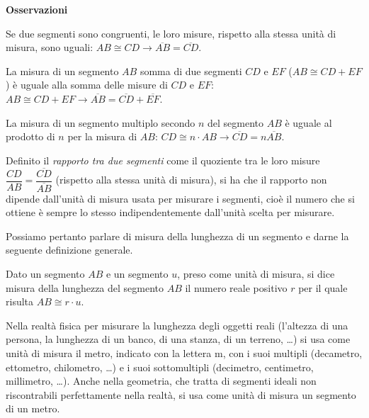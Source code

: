 \textbf{Osservazioni}
\begin{itemize*}
\item Se due segmenti sono congruenti, le loro misure, rispetto alla stessa unità di misura, sono uguali: $AB\cong CD \rightarrow \overline{AB}=\overline{CD}$.
\item La misura di un segmento $AB$ somma di due segmenti $CD$ e $EF$ ($AB\cong CD + EF$) è uguale alla somma delle misure di $CD$ e $EF$: $AB\cong CD + EF \rightarrow \overline{AB}=\overline{CD}+\overline{EF}$.
\item La misura di un segmento multiplo secondo $n$ del segmento $AB$ è uguale al prodotto di $n$ per la misura di $AB$: $CD\cong n\cdot AB \rightarrow \overline{CD}=n\overline{AB}$.
\item Definito il \emph{rapporto tra due segmenti} come il quoziente tra le loro misure $\dfrac{CD}{AB} = \dfrac{\overline{CD}}{\overline{AB}}$ (rispetto alla stessa unità di misura), si ha che il rapporto non dipende dall'unità di misura usata per misurare i segmenti, cioè il numero che si ottiene è sempre lo stesso indipendentemente dall'unità scelta per misurare.
\end{itemize*}

Possiamo pertanto parlare di misura della lunghezza di un segmento e darne la seguente definizione generale.

\begin{definizione}
Dato un segmento $AB$ e un segmento $u$, preso come unità di misura, si dice misura della lunghezza del segmento $AB$ il numero reale positivo $r$ per il quale risulta $AB\cong r\cdot u$.
\end{definizione}

Nella realtà fisica per misurare la lunghezza degli oggetti reali (l'altezza di una persona, la lunghezza di un banco, di una stanza, di un terreno, \ldots{}) si usa come unità di misura il metro, indicato con la lettera m, con i suoi  multipli (decametro, ettometro, chilometro, \ldots{}) e i suoi sottomultipli (decimetro, centimetro, millimetro, \ldots{}). Anche nella geometria, che tratta di segmenti ideali non riscontrabili perfettamente nella realtà, si usa come unità di misura un segmento di un metro.

